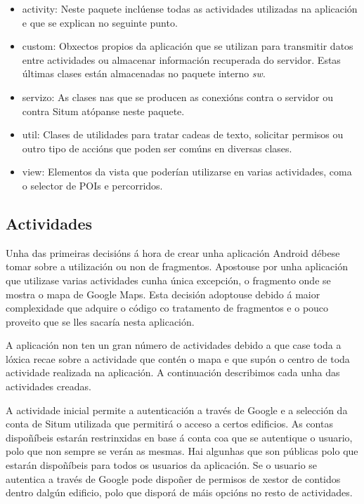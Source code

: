 \begin{itemize}
	\item activity: Neste paquete inclúense todas as actividades utilizadas na aplicación e que se explican no seguinte punto.
	\item custom: Obxectos propios da aplicación que se utilizan para transmitir datos entre actividades ou almacenar información recuperada do servidor. Estas últimas clases están almacenadas no paquete interno \emph{sw}.
	\item servizo: As clases nas que se producen as conexións contra o servidor ou contra Situm atópanse neste paquete.
	\item util: Clases de utilidades para tratar cadeas de texto, solicitar permisos ou outro tipo de accións que poden ser comúns en diversas clases.
	\item view: Elementos da vista que poderían utilizarse en varias actividades, coma o selector de POIs e percorridos.
\end{itemize}

\subsection{Actividades}
Unha das primeiras decisións á hora de crear unha aplicación Android débese tomar sobre a utilización ou non de fragmentos. Apostouse por unha aplicación que utilizase varias actividades cunha única excepción, o fragmento onde se mostra o mapa de Google Maps. Esta decisión adoptouse debido á maior complexidade que adquire o código co tratamento de fragmentos e o pouco proveito que se lles sacaría nesta aplicación.

A aplicación non ten un gran número de actividades debido a que case toda a lóxica recae sobre a actividade que contén o mapa e que supón o centro de toda actividade realizada na aplicación. A continuación describimos cada unha das actividades creadas.

A actividade inicial permite a autenticación a través de Google e a selección da conta de Situm utilizada que permitirá o acceso a certos edificios. As contas dispoñíbeis estarán restrinxidas en base á conta coa que se autentique o usuario, polo que non sempre se verán as mesmas. Hai algunhas que son públicas polo que estarán dispoñíbeis para todos os usuarios da aplicación. Se o usuario se autentica a través de Google pode dispoñer de permisos de xestor de contidos dentro dalgún edificio, polo que disporá de máis opcións no resto de actividades.


